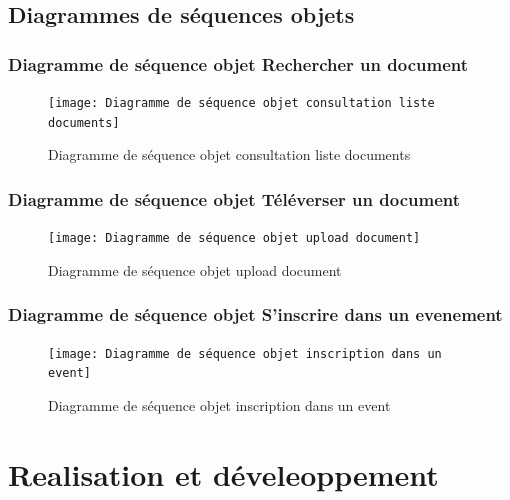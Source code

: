 \documentclass[12pt]{report}
\begin{document}
\begin{landscape}
\section{Diagrammes de séquences objets}
\subsection{Diagramme de séquence objet Rechercher un document}
\begin{figure}[hbtp]
    \centering
    \texttt{[image: Diagramme de séquence objet consultation liste documents]}
    \caption{Diagramme de séquence objet consultation liste documents}
    \label{fig:diagramme de séquence liste documents}
\end{figure}
\end{landscape}
\restoregeometry
\begin{landscape}
\subsection{Diagramme de séquence objet Téléverser un document}
\begin{figure}[hbtp]
    \centering
    \texttt{[image: Diagramme de séquence objet upload document]}
    \caption{Diagramme de séquence objet upload document}
    \label{fig:diagramme de séquence upload document}
\end{figure}
\end{landscape}
\restoregeometry
\begin{landscape}
\subsection{Diagramme de séquence objet S'inscrire dans un evenement}
\begin{figure}[hbtp]
    \centering
    \texttt{[image: Diagramme de séquence objet inscription dans un event]}
    \caption{Diagramme de séquence objet inscription dans un event}
    \label{fig : diagramme de séquence inscription event}
\end{figure}
\end{landscape}
\restoregeometry


\newpage
\chapter{Realisation et déveleoppement}
\end{document}

